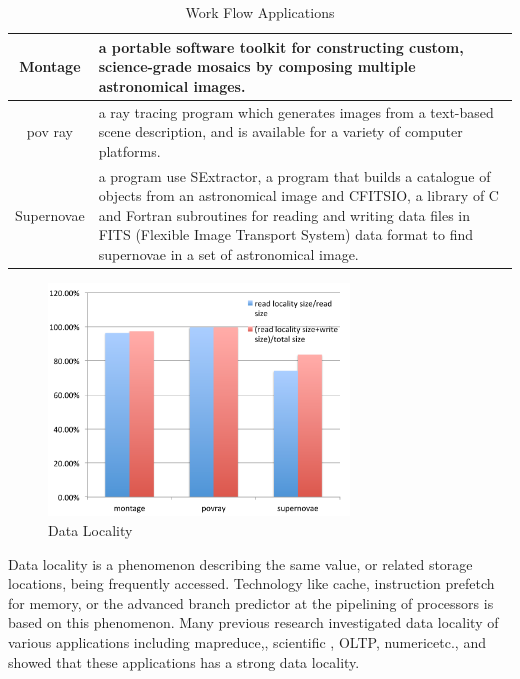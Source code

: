 \begin{table}
\centering
\begin{tabular}{|c|p{150pt}|}
\hline
Montage		&		a portable software toolkit for constructing custom, science-grade 
mosaics by composing multiple astronomical images\cite{montage}.\\\hline
pov ray		&		a ray tracing program which generates images from a text-based scene description, and is
available for a variety of computer platforms\cite{povray}.\\\hline
Supernovae	&	a program use SExtractor\cite{SExtractor}, a program that builds a catalogue of objects
from an astronomical image and CFITSIO\cite{fitsio},  a library of C and Fortran subroutines for
reading and writing data files in FITS (Flexible Image Transport System) data format to find supernovae in a set of
astronomical image.\\
\hline
\end{tabular}
\caption{Work Flow Applications}
\label{background:work flow applications}
\end{table}

\begin{figure}
\centering
\includegraphics[width=8cm]{img/data_locality.pdf}
\caption{Data Locality}
\label{background:data locality}
\end{figure}

Data locality is a phenomenon describing the same value, or related storage locations, being
frequently accessed.
Technology like cache, instruction prefetch for memory, or the advanced branch predictor
at the pipelining of processors is based on this phenomenon.
Many previous research investigated data locality of various
applications including 
mapreduce,\cite{Investigation_of_Data_Locality_in_MapReduce}, scientific
\cite{Intrinsic_data_locality_of_modern_scientific_workloads},
OLTP\cite{Data_locality_characterization_of_OLTP},
numeric\cite{Analyzing_data_locality_in_numeric_applications}etc., and showed that these
applications has a strong data locality.

